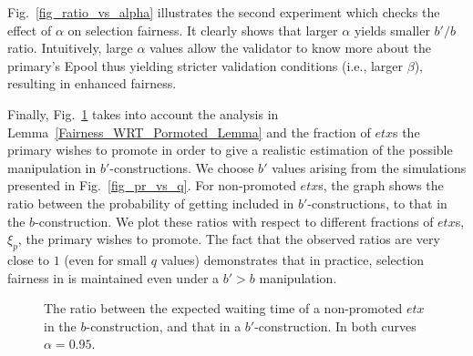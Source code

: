 Fig.~\ref{fig_ratio_vs_alpha} illustrates the second experiment which checks the effect of $\alpha$ on selection fairness. It clearly shows that larger $\alpha$ yields smaller $b'/b$ ratio. Intuitively, large $\alpha$ values allow the validator to know more about the primary's Epool thus yielding stricter validation conditions (i.e., larger $\beta$), resulting in enhanced fairness. %

Finally, Fig.~\ref{fig_tx_inclusion_prob} takes into account the analysis in Lemma~\ref{Fairness_WRT_Pormoted_Lemma} and the fraction of $etx$s the primary wishes to promote in order to give a realistic estimation of the possible manipulation in $b'$-constructions. We choose $b'$ values arising from the simulations presented in Fig.~\ref{fig_pr_vs_q}. For non-promoted $etx$s, the graph shows the ratio between the probability of getting included in $b'$-constructions, to that in the $b$-construction. We plot these ratios with respect to different fractions of $etx$s, $\xi_p$, the primary wishes to promote. 
The fact that the observed ratios are very close to $1$ (even for small $q$ values) demonstrates that in practice, selection fairness in \name is maintained even under a $b'>b$ manipulation.

\begin{figure}[t!]
\caption{The ratio between the expected waiting time of a non-promoted $etx$ in the $b$-construction, and that in a $b'$-construction. In both curves $\alpha=0.95$.
}
 \label{fig_tx_inclusion_prob}
\end{figure}

